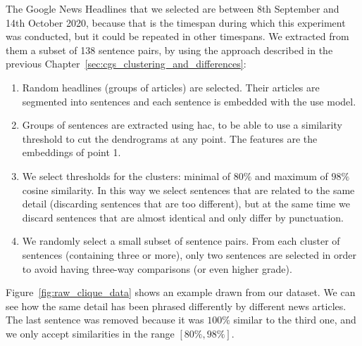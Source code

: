 The Google News Headlines that we selected are between 8th September and 14th October 2020,
because that is the timespan during which this experiment was conducted, but it could be repeated in other timespans.
We extracted from them a subset of 138 sentence pairs, by using the approach described in the previous Chapter~\ref{sec:cgs_clustering_and_differences}:
\begin{enumerate}
    \item Random headlines (groups of articles) are selected. Their articles are segmented into sentences and each sentence is embedded with the \acrshort{use} model.
    \item Groups of sentences are extracted using \acrfull{hac}, to be able to use a similarity threshold to cut the dendrograms at any point. The features are the embeddings of point 1.
    \item We select thresholds for the clusters: minimal of $80\%$ and maximum of $98\%$ cosine similarity. In this way we select sentences that are related to the same detail (discarding sentences that are too different), but at the same time we discard sentences that are almost identical and only differ by punctuation.
    \item We randomly select a small subset of sentence pairs. From each cluster of sentences (containing three or more), only two sentences are selected in order to avoid having three-way comparisons (or even higher grade).
\end{enumerate}

Figure~\ref{fig:raw_clique_data} shows an example drawn from our dataset. We can see how the same detail has been phrased differently by different news articles.
The last sentence was removed because it was $100\%$ similar to the third one, and we only accept similarities in the range $[80\%,98\%]$.

